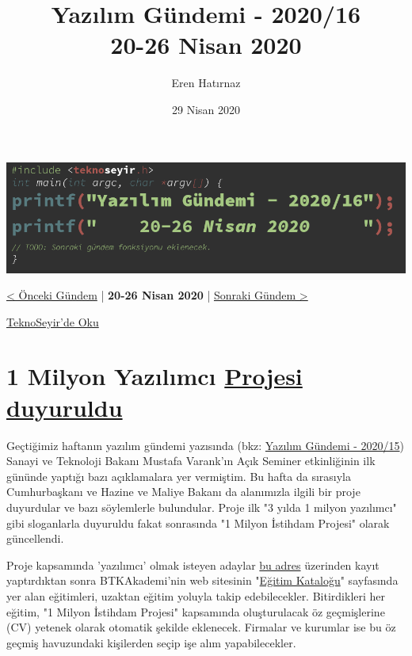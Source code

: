 \documentclass[11pt]{article}
\author{Eren Hatırnaz}
\date{29 Nisan 2020}
\title{Yazılım Gündemi - 2020/16\\\medskip
\large 20-26 Nisan 2020}
\begin{document}
\maketitle
\tableofcontents \clearpage\shorthandoff{=}

\begin{center}
\includegraphics[width=.9\linewidth]{gorseller/yazilim-gundemi-banner.png}
\end{center}

\begin{center}
\href{../15/yazilim-gundemi-2020-15.pdf}{< Önceki Gündem} | \textbf{20-26 Nisan 2020} | \href{../17/yazilim-gundemi-2020-17.pdf}{Sonraki Gündem >}

\href{https://teknoseyir.com/blog/yazilim-gundemi-2020-16}{TeknoSeyir'de Oku}
\end{center}

\section{1 Milyon Yazılımcı \href{https://www.hurriyet.com.tr/galeri-1-milyon-yazilimci-projesi-basvurusu-nasil-yapilir-btk-akademi-egitimleri-nasil-olacak-41499705/1}{Projesi duyuruldu}}
\label{sec:orgb83a2b4}
Geçtiğimiz haftanın yazılım gündemi yazısında (bkz: \href{../15/yazilim-gundemi-2020-15.pdf}{Yazılım Gündemi - 2020/15})
Sanayi ve Teknoloji Bakanı Mustafa Varank'ın Açık Seminer etkinliğinin ilk
gününde yaptığı bazı açıklamalara yer vermiştim. Bu hafta da sırasıyla
Cumhurbaşkanı ve Hazine ve Maliye Bakanı da alanımızla ilgili bir proje
duyurdular ve bazı söylemlerle bulundular. Proje ilk "3 yılda 1 milyon
yazılımcı" gibi sloganlarla duyuruldu fakat sonrasında "1 Milyon İstihdam
Projesi" olarak güncellendi.

Proje kapsamında 'yazılımcı' olmak isteyen adaylar \href{https://1milyonistihdam.hmb.gov.tr/login}{bu adres} üzerinden kayıt
yaptırdıktan sonra BTKAkademi'nin web sitesinin "\href{https://www.btkakademi.gov.tr/portal/catalog}{Eğitim Kataloğu}" sayfasında
yer alan eğitimleri, uzaktan eğitim yoluyla takip edebilecekler. Bitirdikleri
her eğitim, "1 Milyon İstihdam Projesi" kapsamında oluşturulacak öz
geçmişlerine (CV) yetenek olarak otomatik şekilde eklenecek. Firmalar ve
kurumlar ise bu öz geçmiş havuzundaki kişilerden seçip işe alım
yapabilecekler.
\end{document}
